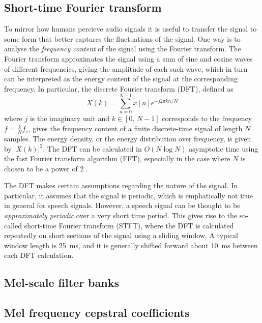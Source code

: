 \subsection{Short-time Fourier transform}


To mirror how humans percieve audio signals it is useful to transfer the signal to some form that better captures the fluctuations of the signal.
One way is to analyse the \emph{frequency content} of the signal using the Fourier transform.
The Fourier transform approximates the signal using a sum of sine and cosine waves of different frequencies, giving the amplitude of each such wave, which in turn can be interpreted as the energy content of the signal at the corresponding frequency.
In particular, the discrete Fourier transform (DFT), defined as
\[
X(k) = \sum_{n=0}^{N-1} x[n]e^{-j2\pi kn/N}
\]
where $j$ is the imaginary unit and $k \in [0,\, N-1]$ corresponds to the frequency $f = \frac{k}{N}f_s$, gives the frequency content of a finite discrete-time signal of length $N$ samples.
The energy density, or the energy distribution over frequency, is given by $\left|X(k)\right|^2$.
The DFT can be calculated in $O(N \log N)$ asymptotic time using the fast Fourier transform algorithm (FFT), especially in the case where $N$ is chosen to be a power of 2 \parencite{cooley1965algorithm}.


The DFT makes certain assumptions regarding the nature of the signal.
In particular, it assumes that the signal is periodic, which is emphatically not true in general for speech signals.
However, a speech signal can be thought to be \emph{approximately periodic} over a very short time period.
This gives rise to the so-called short-time Fourier transform (STFT), where the DFT is calculated repeatedly on short sections of the signal using a sliding window.
A typical window length is \SI{25}{\ms}, and it is generally shifted forward about \SI{10}{\ms} between each DFT calculation.

\subsection{Mel-scale filter banks}
\subsection{Mel frequency cepstral coefficients}
